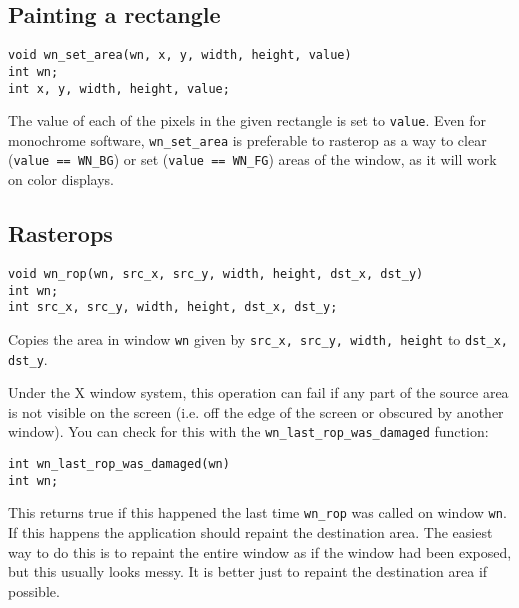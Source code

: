 \subsection{Painting a rectangle}
\begin{verbatim}
void wn_set_area(wn, x, y, width, height, value)
int wn;
int x, y, width, height, value;
\end{verbatim}
The value of each of the pixels in the given rectangle is set to {\tt value}.
Even for monochrome software, {\tt wn\_set\_area} is preferable to rasterop
as a way to clear ({\tt value == WN\_BG}) or set ({\tt value == WN\_FG}) areas
of the window, as it will work on color displays.
\subsection{Rasterops}
\begin{verbatim}
void wn_rop(wn, src_x, src_y, width, height, dst_x, dst_y)
int wn;
int src_x, src_y, width, height, dst_x, dst_y;
\end{verbatim}
Copies the area in window {\tt wn} given by {\tt src\_x, src\_y, width, height}
to {\tt dst\_x, dst\_y}.

Under the X window system, this operation can fail if any part of the source
area is not visible on the screen (i.e. off the edge of the screen or
obscured by another window).
You can check for this with the {\tt wn\_last\_rop\_was\_damaged} function:
\begin{verbatim}
int wn_last_rop_was_damaged(wn)
int wn;
\end{verbatim}
This returns true if this happened the last time {\tt wn\_rop} was called
on window {\tt wn}.
If this happens the application should repaint the destination area.
The easiest way to do this is to repaint the entire window as if
the window had been exposed, but this usually looks messy.
It is better just to repaint the destination area if possible.
